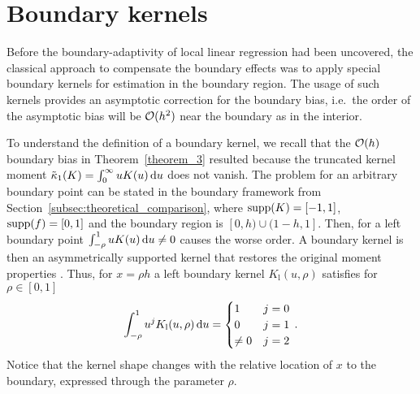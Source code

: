 


\section{Boundary kernels} \label{sec:boundary_kernels}

Before the boundary-adaptivity of local linear regression had been uncovered, the classical approach to compensate the boundary effects was to apply special boundary kernels for estimation in the boundary region.
The usage of such kernels provides an asymptotic correction for the boundary bias,
i.e.\ the order of the asymptotic bias will be $\operatorname{\mathcal{O}}(h^2)$ near the boundary as in the interior.

To understand the definition of a boundary kernel, we recall that the $\operatorname{\mathcal{O}}(h)$ boundary bias in Theorem~\ref{theorem_3} resulted
because the truncated kernel moment $\tilde{\kappa}_1(K) = \int_{0}^{\infty} u K(u) \mathop{}\!\textup{d} u$ does not vanish.
The problem for an arbitrary boundary point can be stated in the boundary framework from Section~\ref{subsec:theoretical_comparison},
where $\operatorname{supp}(K) = [-1, 1]$, $\operatorname{supp}(f) = [0, 1]$ and the boundary region is $[0, h) \cup (1-h, 1]$.  
Then, for a left boundary point $\int_{-\rho}^{1} u K(u) \mathop{}\!\textup{d} u \neq 0$ causes the worse order.
A boundary kernel is then an asymmetrically supported kernel that restores the original moment properties \parencite{Gasser_1979}. 
Thus, for $x = \rho h$ a left boundary kernel $K_{\text{l}}(u, \rho)$ satisfies for $\rho \in [0, 1]$
\begin{equation}
	\int_{-\rho}^{1} u^j K_{\text{l}}(u, \rho) \mathop{}\!\textup{d} u = \begin{cases} 
		1 & j = 0 \\
		0 & j = 1 \\
		\neq 0 & j = 2 
	\end{cases} \,.
\end{equation}
Notice that the kernel shape changes with the relative location of $x$ to the boundary, expressed through the parameter $\rho$. 

